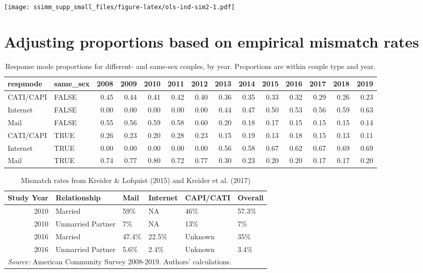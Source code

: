 \documentclass[
  11pt,
]{article}
\begin{document}
\texttt{[image: ssimm\_supp\_small\_files/figure-latex/ols-ind-sim2-1.pdf]}

\newpage

\hypertarget{adjusting-proportions-based-on-empirical-mismatch-rates}{%
\section{Adjusting proportions based on empirical mismatch rates}\label{adjusting-proportions-based-on-empirical-mismatch-rates}}

\begin{table}

\caption{\label{tab:respmode}Response mode proportions for different- and same-sex couples, by year. Proportions are within couple type and year.}
\centering
\fontsize{9}{11}\selectfont
\begin{tabular}[t]{llrrrrrrrrrrrr}
\toprule
respmode & same\_sex & 2008 & 2009 & 2010 & 2011 & 2012 & 2013 & 2014 & 2015 & 2016 & 2017 & 2018 & 2019\\
\midrule
CATI/CAPI & FALSE & 0.45 & 0.44 & 0.41 & 0.42 & 0.40 & 0.36 & 0.35 & 0.33 & 0.32 & 0.29 & 0.26 & 0.23\\
Internet & FALSE & 0.00 & 0.00 & 0.00 & 0.00 & 0.00 & 0.44 & 0.47 & 0.50 & 0.53 & 0.56 & 0.59 & 0.63\\
Mail & FALSE & 0.55 & 0.56 & 0.59 & 0.58 & 0.60 & 0.20 & 0.18 & 0.17 & 0.15 & 0.15 & 0.15 & 0.14\\
CATI/CAPI & TRUE & 0.26 & 0.23 & 0.20 & 0.28 & 0.23 & 0.15 & 0.19 & 0.13 & 0.18 & 0.15 & 0.13 & 0.11\\
Internet & TRUE & 0.00 & 0.00 & 0.00 & 0.00 & 0.00 & 0.56 & 0.58 & 0.67 & 0.62 & 0.67 & 0.69 & 0.69\\
\addlinespace
Mail & TRUE & 0.74 & 0.77 & 0.80 & 0.72 & 0.77 & 0.30 & 0.23 & 0.20 & 0.20 & 0.17 & 0.17 & 0.20\\
\bottomrule
\end{tabular}
\end{table}

\begin{table}

\caption{\label{tab:mismatch}Mismatch rates from Kreider \& Lofquist (2015) and Kreider et al. (2017)}
\centering
\begin{tabular}[t]{rlllll}
\toprule
Study Year & Relationship & Mail & Internet & CAPI/CATI & Overall\\
\midrule
2010 & Married & 59\% & NA & 46\% & 57.3\%\\
2010 & Unmarried Partner & 7\% & NA & 13\% & 7\%\\
2016 & Married & 47.4\% & 22.5\% & Unknown & 35\%\\
2016 & Unmarried Partner & 5.6\% & 2.4\% & Unknown & 3.4\%\\
\bottomrule
\multicolumn{6}{l}{\rule{0pt}{1em}\textit{Source:} American Community Survey 2008-2019. Authors' calculations.}\\
\end{tabular}
\end{table}
\end{document}

